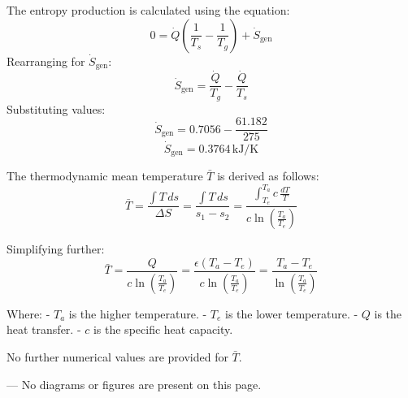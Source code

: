 The entropy production is calculated using the equation:  
\[
0 = \dot{Q} \left( \frac{1}{T_s} - \frac{1}{T_g} \right) + \dot{S}_{\text{gen}}
\]  
Rearranging for \( \dot{S}_{\text{gen}} \):  
\[
\dot{S}_{\text{gen}} = \frac{\dot{Q}}{T_g} - \frac{\dot{Q}}{T_s}
\]  
Substituting values:  
\[
\dot{S}_{\text{gen}} = 0.7056 - \frac{61.182}{275}
\]  
\[
\dot{S}_{\text{gen}} = 0.3764 \, \text{kJ/K}
\]

The thermodynamic mean temperature \( \bar{T} \) is derived as follows:  
\[
\bar{T} = \frac{\int T \, ds}{\Delta S} = \frac{\int T \, ds}{s_1 - s_2} = \frac{\int_{T_e}^{T_a} c \, \frac{dT}{T}}{c \ln \left( \frac{T_a}{T_e} \right)}
\]  

Simplifying further:  
\[
\bar{T} = \frac{Q}{c \ln \left( \frac{T_a}{T_e} \right)} = \frac{\epsilon (T_a - T_e)}{c \ln \left( \frac{T_a}{T_e} \right)} = \frac{T_a - T_e}{\ln \left( \frac{T_a}{T_e} \right)}
\]  

Where:  
- \( T_a \) is the higher temperature.  
- \( T_e \) is the lower temperature.  
- \( Q \) is the heat transfer.  
- \( c \) is the specific heat capacity.  

No further numerical values are provided for \( \bar{T} \).  

---  
No diagrams or figures are present on this page.